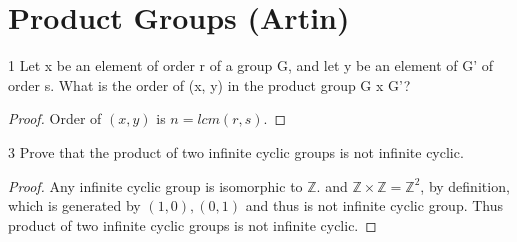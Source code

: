 \documentclass{article}
\newcommand{\Z}{\mathbb{Z}}
\begin{document}
\section*{Product Groups (Artin)}

\begin{PROB}{1}\label{Problem 1.}
    Let x be an element of order r of a group G, and let y be an element of G' of order s.
    What is the order of (x, y) in the product group G x G'?
\end{PROB}
\begin{proof}
    Order of $(x, y)$ is $n = lcm(r, s)$.
\end{proof}

\bigskip

\begin{PROB}{3}\label{Problem 3.}
    Prove that the product of two infinite cyclic groups is not infinite cyclic.
\end{PROB}
\begin{proof}
    Any infinite cyclic group is isomorphic to $\Z$. and $\Z \times \Z = \Z^2$, by definition, which is generated by $(1, 0), (0, 1)$ and thus is not infinite cyclic group. Thus product of two infinite cyclic groups is not infinite cyclic.
\end{proof}

\bigskip
\end{document}
